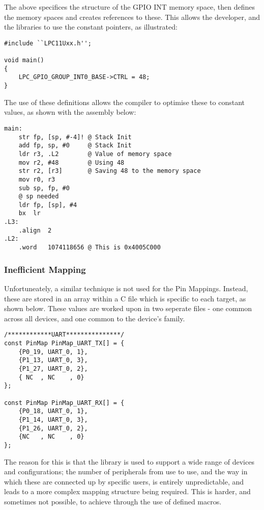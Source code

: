 The above specifices the structure of the GPIO INT memory space, then defines the memory spaces and creates references to these. This allows the developer, and the libraries to use the constant pointers, as illustrated:

\begin{lstlisting}[caption={LPC GPIO GROUP INT0 being used}]
#include ``LPC11Uxx.h'';

void main()
{
    LPC_GPIO_GROUP_INT0_BASE->CTRL = 48;
}
\end{lstlisting}

The use of these definitions allows the compiler to optimise these to constant values, as shown with the assembly below:

\begin{lstlisting}[caption={LPC GPIO GROUP INT0 converted to ASM}]
main:
    str fp, [sp, #-4]! @ Stack Init
    add fp, sp, #0     @ Stack Init
    ldr r3, .L2        @ Value of memory space
    mov r2, #48        @ Using 48
    str r2, [r3]       @ Saving 48 to the memory space
    mov r0, r3
    sub sp, fp, #0
    @ sp needed
    ldr fp, [sp], #4
    bx  lr
.L3:
    .align  2
.L2:
    .word   1074118656 @ This is 0x4005C000
\end{lstlisting}

\subsubsection{Inefficient Mapping}

Unfortuneately, a similar technique is not used for the Pin Mappings. Instead, these are stored in an array within a C file which is specific to each target, as shown below. These values are worked upon in two seperate files - one common across all devices, and one common to the device's family.

\begin{lstlisting}[caption={PinMap Arrays}]
/************UART***************/
const PinMap PinMap_UART_TX[] = {
    {P0_19, UART_0, 1},
    {P1_13, UART_0, 3},
    {P1_27, UART_0, 2},
    { NC  , NC    , 0}
};

const PinMap PinMap_UART_RX[] = {
    {P0_18, UART_0, 1},
    {P1_14, UART_0, 3},
    {P1_26, UART_0, 2},
    {NC   , NC    , 0}
};
\end{lstlisting}

The reason for this is that the library is used to support a wide range of devices and configurations; the number of peripherals from use to use, and the way in which these are connected up by specific users, is entirely unpredictable, and leads to a more complex mapping structure being required. This is harder, and sometimes not possible, to achieve through the use of defined macros.

